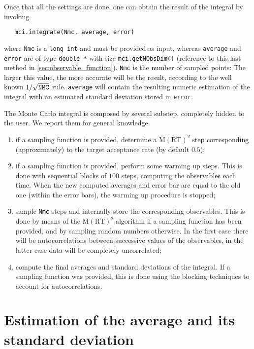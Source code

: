 \documentclass[11pt,a4paper,twoside]{article}
\newcommand{\MRTWO}{$ \text{M}(\text{RT})^2 \;$}
\begin{document}
Once that all the settings are done, one can obtain the result of the integral by invoking
\begin{verbatim}
   mci.integrate(Nmc, average, error)
\end{verbatim}
where \verb+Nmc+ is a \verb+long int+ and must be provided as input, whereas \verb+average+ and \verb+error+ are of type \verb+double *+ with size \verb+mci.getNObsDim()+ (reference to this last method in \ref{sec:observable_function}).
\verb+Nmc+ is the number of sampled points: The larger this value, the more accurate will be the result, according to the well known $1/\sqrt{\verb+NMC+}$ rule.
\verb+average+ will contain the resulting numeric estimation of the integral with an estimated standard deviation stored in \verb+error+.

The Monte Carlo integral is composed by several substep, completely hidden to the user.
We report them for general knowledge.
\begin{enumerate}
\item if a sampling function is provided, determine a \MRTWO step corresponding (approximately) to the target acceptance rate (by default $0.5$);
\item if a sampling function is provided, perform some warming up steps. This is done with sequential blocks of $100$ steps, computing the observables each time. When the new computed averages and error bar are equal to the old one (within the error bars), the warming up procedure is stopped;
\item sample \verb+Nmc+ steps and internally store the corresponding observables. This is done by means of the \MRTWO algorithm if a sampling function has been provided, and by sampling random numbers otherwise. In the first case there will be autocorrelations between successive values of the observables, in the latter case data will be completely uncorrelated;
\item compute the final averages and standard deviations of the integral. If a sampling function was provided, this is done using the blocking techniques to account for autocorrelations.
\end{enumerate}





\section{Estimation of the average and its standard deviation} %
\label{sec:mean_estimation_and_standard_deviation}
\end{document}
